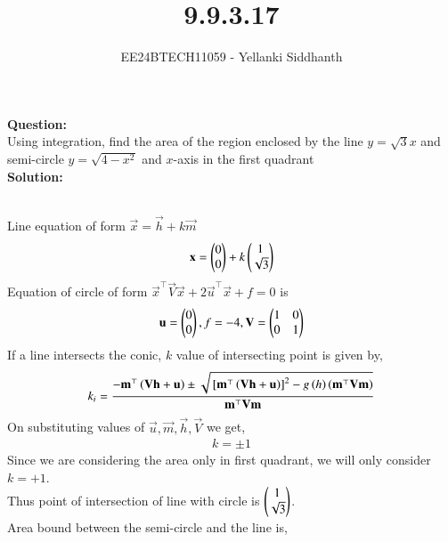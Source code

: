 \documentclass[journal]{IEEEtran}
\begin{document}
	
	
	\vspace{3cm}
	
	\title{9.9.3.17}
	\author{EE24BTECH11059 - Yellanki Siddhanth
	}
	{\let\newpage\relax\maketitle}
	
	\renewcommand{\thefigure}{\theenumi}
	\renewcommand{\thetable}{\theenumi}
	\setlength{\intextsep}{10pt} %
	
	
	\renewcommand{\thetable}{\theenumi}
	
\textbf{Question: }\\
Using integration, find the area of the region enclosed by the line $y=\sqrt{3} x$ and semi-circle $y= \sqrt{4-x^2}$ and $x$-axis in the first quadrant \\ 
\textbf{Solution: } \\
\begin{table}[h!]    
	\centering
	
	\caption{}
\end{table}\\
Line equation of form $\vec{x}=\vec{h}+k\vec{m}$
\begin{align}
	\mathbf{x}=\begin{pmatrix}0\\0\end{pmatrix}+k\begin{pmatrix}1\\ \sqrt{3}\end{pmatrix}
\end{align}
Equation of circle of form $\vec{x}^{\top}\vec{V}\vec{x}+2\vec{u}^{\top}\vec{x}+f=0$ is
\begin{align}
	\mathbf{u}=\begin{pmatrix}0\\0\end{pmatrix},f=-4,\mathbf{V}=\begin{pmatrix}1&0\\0&1\end{pmatrix}
\end{align}
If a line intersects the conic, $k$ value of intersecting point is given by,
\begin{align}
	k_i=\frac{-\mathbf{m}^{\top}\left(\mathbf{Vh}+\mathbf{u}\right)\pm\sqrt{{}\left[\mathbf{m}^{\top}\left(\mathbf{Vh}+\mathbf{u}\right)\right]^2-g\left(h\right)\left(\mathbf{m}^{\top}\mathbf{Vm}\right)}}{\mathbf{m}^{\top}\mathbf{Vm}}
\end{align}
On substituting values of $\vec{u},\vec{m},\vec{h},\vec{V}$ we get,
\begin{align}
	k = \pm 1 
\end{align}
Since we are considering the area only in first quadrant, we will only consider $k = +1$.\\
Thus point of intersection of line with circle is $\begin{pmatrix}1\\ \sqrt{3}\end{pmatrix}$.\\ 
Area bound between the semi-circle and the line is,
\end{document}
